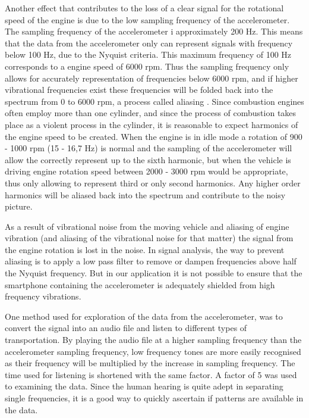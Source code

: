 Another effect that contributes to the loss of a clear signal for the rotational speed of the engine is due to the low sampling frequency of the accelerometer. The sampling frequency of the accelerometer i approximately 200 Hz. This means that the data from the accelerometer only can represent signals with frequency below 100 Hz, due to the Nyquist criteria. This maximum frequency of 100 Hz corresponds to a engine speed of 6000 rpm. Thus the sampling frequency only allows for accurately representation of frequencies below 6000 rpm, and if higher vibrational frequencies exist these frequencies will be folded back into the spectrum from 0 to 6000 rpm, a process called aliasing \cite{lyons2010understanding}. Since combustion engines often employ more than one cylinder, and since the process of combustion takes place as a violent process in the cylinder, it is reasonable to expect harmonics of the engine speed to be created. When the engine is in idle mode a rotation of 900 - 1000 rpm (15 - 16,7 Hz) is normal and the sampling of the accelerometer will allow the correctly represent up to the sixth harmonic, but when the vehicle is driving engine rotation speed between  
2000 - 3000 rpm would be appropriate, thus only allowing to represent third or only second harmonics. Any higher order harmonics will be aliased back into the spectrum and contribute to the noisy picture. 

As a result of vibrational noise from the moving vehicle and aliasing of engine vibration (and aliasing of the vibrational noise for that matter) the signal from the engine rotation is lost in the noise. In signal analysis, the way to prevent aliasing is to apply a low pass filter to remove or dampen frequencies above half the Nyquist frequency. But in our application it is not possible to ensure that the smartphone containing the accelerometer is adequately shielded from high frequency vibrations.

One method used for exploration of the data from the accelerometer, was to convert the signal into an audio file and listen to different types of transportation. By playing the audio file at a higher sampling frequency than the accelerometer sampling frequency, low frequency tones are more easily recognised as their frequency will be multiplied by the increase in sampling frequency. The time used for listening is shortened with the same factor. A factor of 5 was used to examining the data. Since the human hearing is quite adept in separating single frequencies, it is a good way to quickly ascertain if patterns are available in the data.

